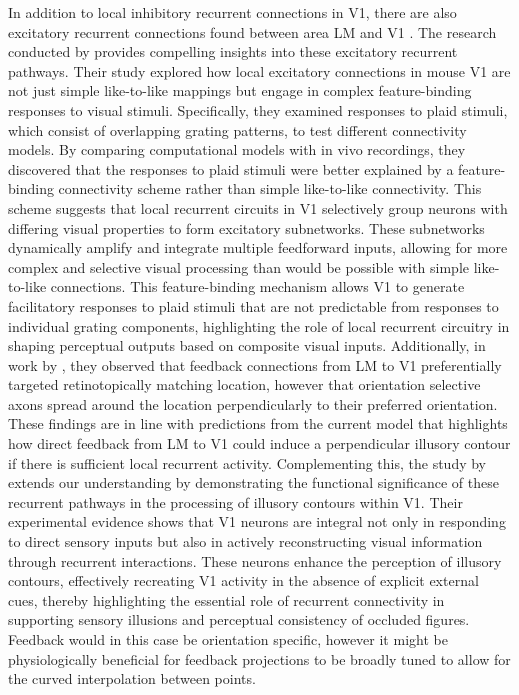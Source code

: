 \documentclass[12pt]{article}
\begin{document}
In addition to local inhibitory recurrent connections in V1, there are also excitatory recurrent connections found between area LM and V1 \autocite{muirSpecificExcitatoryConnectivity2017}. The research conducted by \textcite{muirSpecificExcitatoryConnectivity2017} provides compelling insights into these excitatory recurrent pathways. Their study explored how local excitatory connections in mouse V1 are not just simple like-to-like mappings but engage in complex feature-binding responses to visual stimuli. Specifically, they examined responses to plaid stimuli, which consist of overlapping grating patterns, to test different connectivity models. By comparing computational models with in vivo recordings, they discovered that the responses to plaid stimuli were better explained by a feature-binding connectivity scheme rather than simple like-to-like connectivity. This scheme suggests that local recurrent circuits in V1 selectively group neurons with differing visual properties to form excitatory subnetworks. These subnetworks dynamically amplify and integrate multiple feedforward inputs, allowing for more complex and selective visual processing than would be possible with simple like-to-like connections. This feature-binding mechanism allows V1 to generate facilitatory responses to plaid stimuli that are not predictable from responses to individual grating components, highlighting the role of local recurrent circuitry in shaping perceptual outputs based on composite visual inputs. Additionally, in work by \textcite{marquesFunctionalOrganizationCortical2018}, they observed that feedback connections from LM to V1 preferentially targeted retinotopically matching location, however that orientation selective axons spread around the location perpendicularly to their preferred orientation. These findings are in line with predictions from the current model that highlights how direct feedback from LM to V1 could induce a perpendicular illusory contour if there is sufficient local recurrent activity. Complementing this, the study by \textcite{shinRecurrentPatternCompletion2023} extends our understanding by demonstrating the functional significance of these recurrent pathways in the processing of illusory contours within V1. Their experimental evidence shows that V1 neurons are integral not only in responding to direct sensory inputs but also in actively reconstructing visual information through recurrent interactions. These neurons enhance the perception of illusory contours, effectively recreating V1 activity in the absence of explicit external cues, thereby highlighting the essential role of recurrent connectivity in supporting sensory illusions and perceptual consistency of occluded figures. Feedback would in this case be orientation specific, however it might be physiologically beneficial for feedback projections to be broadly tuned to allow for the curved interpolation between points.
\end{document}
